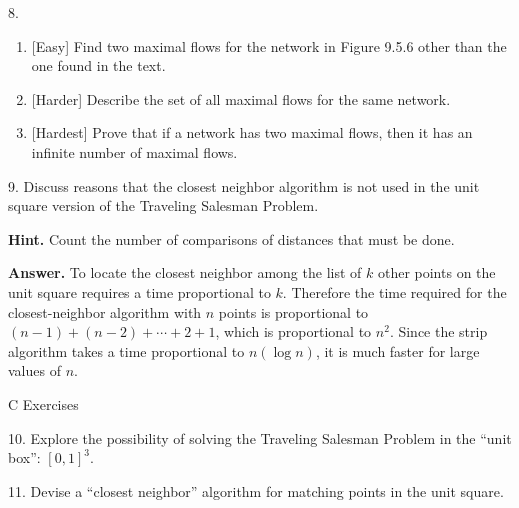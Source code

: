 \documentclass[10pt,]{book}
\theoremstyle{plain}
\theoremstyle{definition}
\theoremstyle{definition}
\theoremstyle{definition}
\theoremstyle{definition}
\theoremstyle{definition}
\numberwithin{equation}{section}
\begin{document}
\begin{exercisegroup}
\item[8.]\hypertarget{exercise-38}{}\leavevmode%
\begin{enumerate}[label=\alph*]
\item\hypertarget{li-119}{} [Easy] Find two maximal flows for the network in Figure 9.5.6 other than the one found in the text.%
\item\hypertarget{li-120}{}  [Harder] Describe the set of all maximal flows for the same network.%
\item\hypertarget{li-121}{}  [Hardest] Prove that if a network has two maximal flows, then it has an infinite number of maximal flows.%
\end{enumerate}
%
\par\smallskip
\item[9.]\hypertarget{exercise-39}{}Discuss reasons that the closest neighbor algorithm is not used in the unit square version of the Traveling Salesman Problem.%
\par\smallskip
\par\smallskip
\noindent\textbf{Hint.}\hypertarget{hint-2}{}\quad
Count the number of comparisons of distances that must be done.%
\par\smallskip
\noindent\textbf{Answer.}\hypertarget{answer-15}{}\quad
 To locate the closest neighbor among the list of \(k\) other points on the unit square requires a time proportional to \(k\). Therefore
the time required for the closest-neighbor algorithm with \(n\) points is proportional to \((n-1)+(n-2)+\cdots +2+1\), which is proportional
to \(n^2\). Since the strip algorithm takes a time proportional to \(n(\log  n)\), it is much faster for large values of \(n\).
%
\end{exercisegroup}
\par\smallskip\noindent
\hypertarget{exercisegroup-9}{}\typeout{************************************************}
\typeout{************************************************}
C Exercises%
\begin{exercisegroup}
\item[10.]\hypertarget{exercise-40}{} Explore the possibility of solving the Traveling Salesman Problem in the ``unit box'': \([0,1]^3\).%
\par\smallskip
\item[11.]\hypertarget{exercise-41}{} Devise a ``closest neighbor'' algorithm for matching points in the unit square.
%
\par\smallskip
\end{exercisegroup}
\par\smallskip\noindent
\typeout{************************************************}
\typeout{************************************************}
\end{document}

